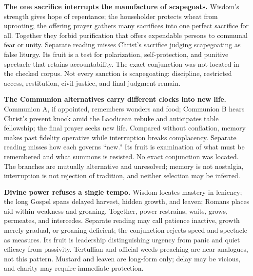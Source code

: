 \begin{deepstudy}
\noindent\textbf{The one sacrifice interrupts the manufacture of scapegoats.\enspace{}}
Wisdom's strength gives hope of repentance; the householder protects wheat from uprooting; the offering prayer gathers many sacrifices into one perfect sacrifice for all. Together they forbid purification that offers expendable persons to communal fear or unity. Separate reading misses Christ's sacrifice judging scapegoating as false liturgy. Its fruit is a test for polarization, self-protection, and punitive spectacle that retains accountability. The exact conjunction was not located in the checked corpus. Not every sanction is scapegoating: discipline, restricted access, restitution, civil justice, and final judgment remain.

\noindent\textbf{The Communion alternatives carry different clocks into new life.\enspace{}}
Communion A, if appointed, remembers wonders and food; Communion B hears Christ's present knock amid the Laodicean rebuke and anticipates table fellowship; the final prayer seeks new life. Compared without conflation, memory makes past fidelity operative while interruption breaks complacency. Separate reading misses how each governs “new.” Its fruit is examination of what must be remembered and what summons is resisted. No exact conjunction was located. The branches are mutually alternative and unresolved; memory is not nostalgia, interruption is not rejection of tradition, and neither selection may be inferred.

\noindent\textbf{Divine power refuses a single tempo.\enspace{}}
Wisdom locates mastery in leniency; the long Gospel spans delayed harvest, hidden growth, and leaven; Romans places aid within weakness and groaning. Together, power restrains, waits, grows, permeates, and intercedes. Separate reading may call patience inactive, growth merely gradual, or groaning deficient; the conjunction rejects speed and spectacle as measures. Its fruit is leadership distinguishing urgency from panic and quiet efficacy from passivity. Tertullian and official weeds preaching are near analogues, not this pattern. Mustard and leaven are long-form only; delay may be vicious, and charity may require immediate protection.

\clearpage

\pcresolutionappendix


\end{deepstudy}

